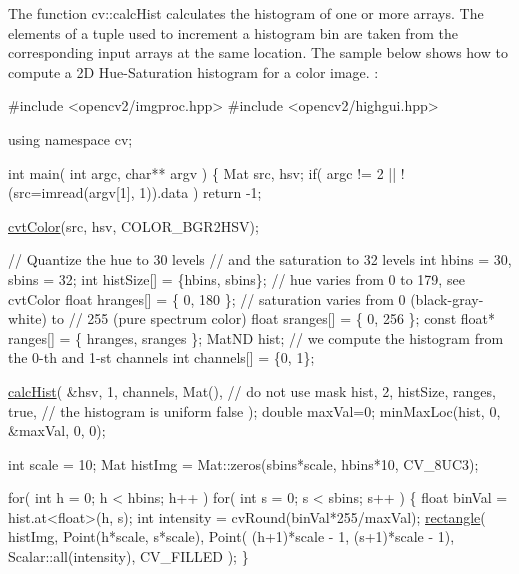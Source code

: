 The function cv\+::calc\+Hist calculates the histogram of one or more arrays. The elements of a tuple used to increment a histogram bin are taken from the corresponding input arrays at the same location. The sample below shows how to compute a 2D Hue-\/\+Saturation histogram for a color image. \+: 
\begin{DoxyPre}
\begin{DoxyCode}
\textcolor{preprocessor}{#include <opencv2/imgproc.hpp>}
\textcolor{preprocessor}{#include <opencv2/highgui.hpp>}

\textcolor{keyword}{using namespace }cv;

\textcolor{keywordtype}{int} main( \textcolor{keywordtype}{int} argc, \textcolor{keywordtype}{char}** argv )
\{
    Mat src, hsv;
    \textcolor{keywordflow}{if}( argc != 2 || !(src=imread(argv[1], 1)).data )
        \textcolor{keywordflow}{return} -1;

    \hyperlink{group__imgproc__misc_gaab99985581c43cce9df680e6586cb9ef}{cvtColor}(src, hsv, COLOR\_BGR2HSV);

    \textcolor{comment}{// Quantize the hue to 30 levels}
    \textcolor{comment}{// and the saturation to 32 levels}
    \textcolor{keywordtype}{int} hbins = 30, sbins = 32;
    \textcolor{keywordtype}{int} histSize[] = \{hbins, sbins\};
    \textcolor{comment}{// hue varies from 0 to 179, see cvtColor}
    \textcolor{keywordtype}{float} hranges[] = \{ 0, 180 \};
    \textcolor{comment}{// saturation varies from 0 (black-gray-white) to}
    \textcolor{comment}{// 255 (pure spectrum color)}
    \textcolor{keywordtype}{float} sranges[] = \{ 0, 256 \};
    \textcolor{keyword}{const} \textcolor{keywordtype}{float}* ranges[] = \{ hranges, sranges \};
    MatND hist;
    \textcolor{comment}{// we compute the histogram from the 0-th and 1-st channels}
    \textcolor{keywordtype}{int} channels[] = \{0, 1\};

    \hyperlink{group__imgproc__hist_ga5d3d264cae4eeaf1ffac100661154b5a}{calcHist}( &hsv, 1, channels, Mat(), \textcolor{comment}{// do not use mask}
             hist, 2, histSize, ranges,
             \textcolor{keyword}{true}, \textcolor{comment}{// the histogram is uniform}
             \textcolor{keyword}{false} );
    \textcolor{keywordtype}{double} maxVal=0;
    minMaxLoc(hist, 0, &maxVal, 0, 0);

    \textcolor{keywordtype}{int} scale = 10;
    Mat histImg = Mat::zeros(sbins*scale, hbins*10, CV\_8UC3);

    \textcolor{keywordflow}{for}( \textcolor{keywordtype}{int} h = 0; h < hbins; h++ )
        \textcolor{keywordflow}{for}( \textcolor{keywordtype}{int} s = 0; s < sbins; s++ )
        \{
            \textcolor{keywordtype}{float} binVal = hist.at<\textcolor{keywordtype}{float}>(h, s);
            \textcolor{keywordtype}{int} intensity = cvRound(binVal*255/maxVal);
            \hyperlink{group__imgproc__draw_ga011e780e69d07eab5e5e6ac46d4d8dde}{rectangle}( histImg, Point(h*scale, s*scale),
                        Point( (h+1)*scale - 1, (s+1)*scale - 1),
                        Scalar::all(intensity),
                        CV\_FILLED );
        \}


\end{DoxyCode}
\end{DoxyPre}
